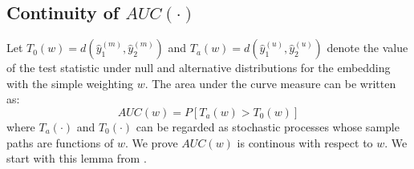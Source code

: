 \documentclass[12pt]{article} %
\begin{document}
 
\subsection{Continuity of $AUC(\cdot)$} 
 Let $T_0(w)=d(\hat{y}_{1}^{{(m)}},\hat{y}_{2}^{{(m)}})$ and $T_a(w)=d(\hat{y}_{1}^{(u)},\hat{y}_{2}^{(u)})$ denote the value of the test statistic under null and alternative distributions  for the embedding with the simple weighting $w$.  %
The area under the curve measure can be written as: $$AUC(w)=P\left[T_a(w)>T_0(w)\right]$$ where $T_a(\cdot)$ and $T_0(\cdot)$  can be regarded as  stochastic processes whose sample paths are functions  of $w$. We prove $AUC(w)$ is continous with respect to $w$.
We start with this lemma from \cite{Raik1972}.
\end{document}
